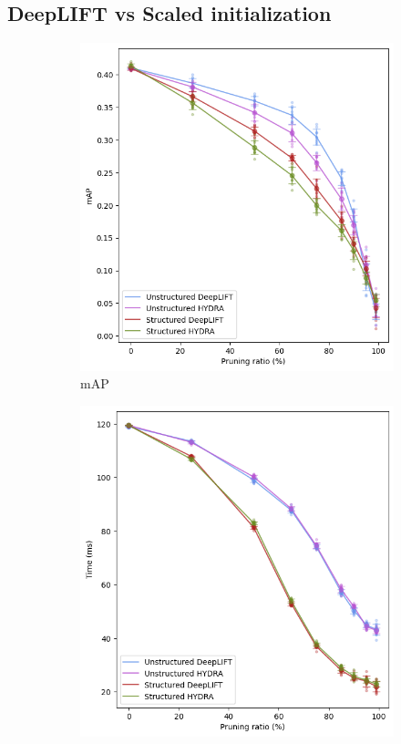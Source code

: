 \documentclass[journal,onecolumn,12pt]{IEEEtran}
\begin{document}
\subsection{DeepLIFT vs Scaled initialization}


\begin{figure}
    \centering
    \captionsetup{justification=centering,margin=1cm}
    \begin{subfigure}[b]{.5\textwidth}
      \centering
      \includegraphics[width=1\linewidth]{figures/mAP1.PNG}
      \caption{mAP}
      \label{fig:mAP1}
    \end{subfigure}%
    \begin{subfigure}[b]{.5\textwidth}
      \centering
      \includegraphics[width=1\linewidth]{figures/time1.PNG}

\end{subfigure}
\end{figure}
\end{document}
